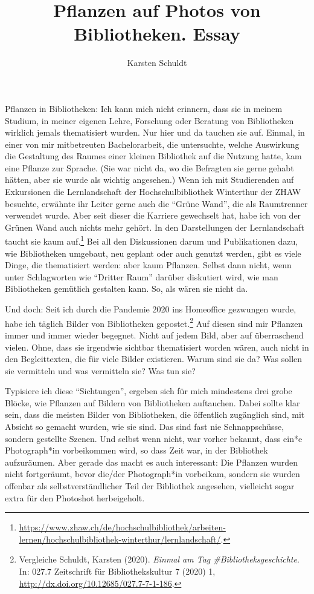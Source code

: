 \documentclass[a4paper,
fontsize=11pt,
oneside,
numbers=noperiodatend,
parskip=half-,
bibliography=totoc,
final
]{scrartcl}
\title{\LARGE{Pflanzen auf Photos von Bibliotheken. Essay}}%
\author{Karsten Schuldt} %
\date{}
\begin{document}
\maketitle
\thispagestyle{fancyplain} 


Pflanzen in Bibliotheken: Ich kann mich nicht erinnern, dass sie in
meinem Studium, in meiner eigenen Lehre, Forschung oder Beratung von
Bibliotheken wirklich jemals thematisiert wurden. Nur hier und da
tauchen sie auf. Einmal, in einer von mir mitbetreuten Bachelorarbeit,
die untersuchte, welche Auswirkung die Gestaltung des Raumes einer
kleinen Bibliothek auf die Nutzung hatte, kam eine Pflanze zur Sprache.
(Sie war nicht da, wo die Befragten sie gerne gehabt hätten, aber sie
wurde als wichtig angesehen.) Wenn ich mit Studierenden auf Exkursionen
die Lernlandschaft der Hochschulbibliothek Winterthur der ZHAW besuchte,
erwähnte ihr Leiter gerne auch die \enquote{Grüne Wand}, die als
Raumtrenner verwendet wurde. Aber seit dieser die Karriere gewechselt
hat, habe ich von der Grünen Wand auch nichts mehr gehört. In den
Darstellungen der Lernlandschaft taucht sie kaum auf.\footnote{\url{https://www.zhaw.ch/de/hochschulbibliothek/arbeiten-lernen/hochschulbibliothek-winterthur/lernlandschaft/}.}
Bei all den Diskussionen darum und Publikationen dazu, wie Bibliotheken
umgebaut, neu geplant oder auch genutzt werden, gibt es viele Dinge, die
thematisiert werden: aber kaum Pflanzen. Selbst dann nicht, wenn unter
Schlagworten wie \enquote{Dritter Raum} darüber diskutiert wird, wie man
Bibliotheken gemütlich gestalten kann. So, als wären sie nicht da.

Und doch: Seit ich durch die Pandemie 2020 ins Homeoffice gezwungen
wurde, habe ich täglich Bilder von Bibliotheken gepostet.\footnote{Vergleiche
  Schuldt, Karsten (2020). \emph{Einmal am Tag \#Bibliotheksgeschichte}.
  In: 027.7 Zeitschrift für Bibliothekskultur 7 (2020) 1,
  \url{http://dx.doi.org/10.12685/027.7-7-1-186}.} Auf diesen sind mir
Pflanzen immer und immer wieder begegnet. Nicht auf jedem Bild, aber auf
überraschend vielen. Ohne, dass sie irgendwie sichtbar thematisiert
worden wären, auch nicht in den Begleittexten, die für viele Bilder
existieren. Warum sind sie da? Was sollen sie vermitteln und was
vermitteln sie? Was tun sie?

Typisiere ich diese \enquote{Sichtungen}, ergeben sich für mich
mindestens drei grobe Blöcke, wie Pflanzen auf Bildern von Bibliotheken
auftauchen. Dabei sollte klar sein, dass die meisten Bilder von
Bibliotheken, die öffentlich zugänglich sind, mit Absicht so gemacht
wurden, wie sie sind. Das sind fast nie Schnappschüsse, sondern
gestellte Szenen. Und selbst wenn nicht, war vorher bekannt, dass ein*e
Photograph*in vorbeikommen wird, so dass Zeit war, in der Bibliothek
aufzuräumen. Aber gerade das macht es auch interessant: Die Pflanzen
wurden nicht fortgeräumt, bevor die/der Photograph*in vorbeikam, sondern
sie wurden offenbar als selbstverständlicher Teil der Bibliothek
angesehen, vielleicht sogar extra für den Photoshot herbeigeholt.
\end{document}
